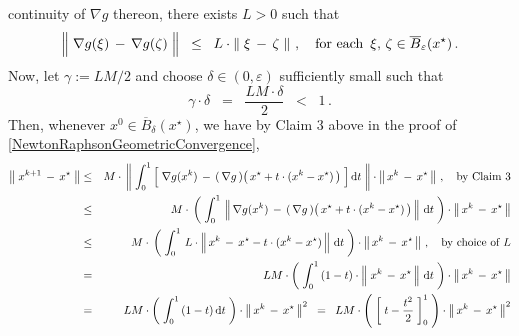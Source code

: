 \begin{enumerate}
	continuity of $\nabla g$ thereon, there exists $L > 0$ such that
	\begin{equation*}
	\left\Vert\; \nabla g(\xi) \,\overset{{\color{white}.}}{-}\, \nabla g(\zeta)\;\right\Vert
	\;\; \leq \;\;
		L \cdot \left\Vert\; \xi \,-\, \zeta \;\right\Vert\,,
	\quad
	\textnormal{for each \,$\xi,\,\zeta \in \overline{B}_{\varepsilon}(x^{\star})$}\,.
	\end{equation*}
	Now, let $\gamma := LM/2$ and choose $\delta \in (0,\varepsilon)$ sufficiently small such that
	\begin{equation*}
	\gamma \cdot \delta \;\; = \;\; \dfrac{LM\cdot\delta}{2} \;\; < \;\; 1\,.
	\end{equation*}
	Then, whenever $x^{0} \in \overline{B}_{\delta}(x^{\star})$, we have
	by Claim 3 above in the proof of \eqref{NewtonRaphsonGeometricConvergence},
	\begin{eqnarray*}
	\left\Vert\;x^{k+1} \,-\, x^{\star}\;\right\Vert
	&\leq&
		M \cdot\,
		\left\Vert\;
			\int_{0}^{1}
			\left[\;
				\overset{{\color{white}.}}{\nabla} g(x^{k})
				\,-\,
				\left(\,\nabla g\,\right)\!\left(\,x^{\star} + t\cdot(x^{k}-x^{\star})\,\right)
			\;\right]
			\d t
		\;\right\Vert
		\cdot
		\left\Vert\,x^{k} \,-\, x^{\star}\,\right\Vert\,,
		\quad
		\textnormal{by Claim 3}
	\\
	&\leq&
		M \cdot\,
		\left(\;\int_{0}^{1}\,
			\left\Vert\,
				\overset{{\color{white}.}}{\nabla} g(x^{k})
				\,-\,
				\left(\,\nabla g\,\right)\!\left(\,x^{\star} + t\cdot(x^{k}-x^{\star})\,\right)
			\,\right\Vert
		\,\d t\;\right)
		\cdot
		\left\Vert\,x^{k} \,-\, x^{\star}\,\right\Vert
	\\
	&\leq&
		M \cdot\,
		\left(\;\int_{0}^{1}\,
			L \cdot
			\left\Vert\,
				x^{k} \,\overset{{\color{white}.}}{-}\, x^{\star} - t\cdot(x^{k}-x^{\star})
			\,\right\Vert
		\,\d t\;\right)
		\cdot
		\left\Vert\,x^{k} \,-\, x^{\star}\,\right\Vert\,,
		\quad
		\textnormal{by choice of $L$}
	\\
	&=&
		L M \cdot
		\left(\;\int_{0}^{1}\,	
			(1-t)\cdot
			\left\Vert\;
				x^{k} \,\overset{{\color{white}.}}{-}\, x^{\star}
			\,\right\Vert
		\,\d t\;\right)
		\cdot
		\left\Vert\,x^{k} \,-\, x^{\star}\,\right\Vert
	\\
	&=&
		L M \cdot
		\left(\;\int_{0}^{1}\,(1-t)\,\d t\;\right)
		\cdot
		\left\Vert\,x^{k} \,-\, x^{\star}\,\right\Vert^{2}
	\;\; = \;\;
		L M \cdot
		\left(\;\left[\;t - \dfrac{t^{2}}{2}\;\right]_{0}^{1}\;\right)
		\cdot
		\left\Vert\,x^{k} \,-\, x^{\star}\,\right\Vert^{2}
	\\

\end{eqnarray*}
\end{enumerate}
